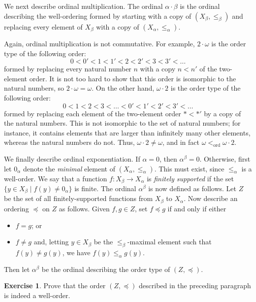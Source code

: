 \documentclass[a4paper]{memoir}
\theoremstyle{definition}
\newtheorem{exercise}[theorem]{Exercise}
\begin{document}
We next describe ordinal multiplication. The ordinal 
$\alpha \cdot \beta$ is the ordinal describing the well-ordering formed by starting with a copy of 
$(X_\beta, \leq_\beta)$ and replacing every element of $X_\beta$ with a copy of 
$(X_\alpha, \leq_\alpha)$.

Again, ordinal multiplication is not commutative. For example, $2 \cdot \omega$ is the order type 
of the following order:
\[
  0 < 0' < 1 < 1' < 2 < 2' < 3 < 3' < \ldots
\]
formed by replacing every natural number $n$ with a copy $n < n'$ of the two-element order.
It is not too hard to show that this order is isomorphic to the natural numbers, so 
$2 \cdot \omega = \omega$. On the other hand, $\omega \cdot 2$ is the order type of the following order:
\[
  0 < 1 < 2 < 3 < \ldots < 0' < 1' < 2' < 3' < \ldots
\]
formed by replacing each element of the two-element order $\ast < \ast'$ by a copy of the natural 
numbers. This is not isomorphic to the set of natural numbers; for instance, it contains elements 
that are larger than infinitely many other elements, whereas the natural numbers do not. 
Thus, $\omega \cdot 2 \neq \omega$, and in fact $\omega <_{\mathrm{ord}} \omega \cdot 2$.

We finally describe ordinal exponentiation. If $\alpha = 0$, then $\alpha^\beta = 0$. 
Otherwise, first let $0_\alpha$ denote the 
\emph{minimal} element of $(X_\alpha, \leq_\alpha)$. This must exist, since $\leq_\alpha$ 
is a well-order. We say that a function $f: X_\beta \rightarrow X_\alpha$ is \emph{finitely 
supported} if the set $\{y \in X_\beta \mid f(y) \neq 0_\alpha\}$ is finite. The ordinal 
$\alpha^\beta$ is now defined as follows. Let $Z$ be the set of all finitely-supported 
functions from $X_\beta$ to $X_\alpha$. Now describe an ordering $\preceq$ on $Z$ as follows. 
Given $f,g \in Z$, set $f \preceq g$ if and only if either
\begin{itemize}
  \item $f = g$; or
  \item $f \neq g$ and, letting $y \in X_\beta$ be the $\leq_\beta$-maximal element such that 
  $f(y) \neq g(y)$, we have $f(y) \leq_\alpha g(y)$.
\end{itemize}
Then let $\alpha^\beta$ be the ordinal describing the order type of $(Z, \preceq)$.

\begin{exercise}
  Prove that the order $(Z, \preceq)$ described in the preceding paragraph is indeed a well-order.
\end{exercise}
\end{document}
